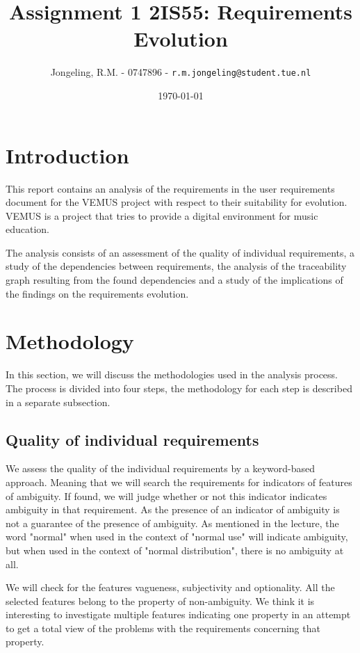\documentclass[a4paper,twoside, twocolumn,11pt]{article}
\title{\vspace{-\baselineskip}\sffamily\bfseries Assignment 1 2IS55: Requirements Evolution}
\author{Jongeling, R.M. - 0747896 - {\tt r.m.jongeling@student.tue.nl}}
\date{\today}
\numberwithin{equation}{section}
\begin{document}
\maketitle

\section{Introduction}
This report contains an analysis of the requirements in the user requirements document for the VEMUS project \cite{VEMUS} with respect to their suitability for evolution. VEMUS is a project that tries to provide a digital environment for music education. 

The analysis consists of an assessment of the quality of individual requirements, a study of the dependencies between requirements, the analysis of the traceability graph resulting from the found dependencies and a study of the implications of the findings on the requirements evolution.

\section{Methodology}
In this section, we will discuss the methodologies used in the analysis process. The process is divided into four steps, the methodology for each step is described in a separate subsection.

\subsection{Quality of individual requirements}
We assess the quality of the individual requirements by a keyword-based approach. Meaning that we will search the requirements for indicators of features of ambiguity. If found, we will judge whether or not this indicator indicates ambiguity in that requirement. As the presence of an indicator of ambiguity is not a guarantee of the presence of ambiguity. As mentioned in the lecture, the word "normal" when used in the context of "normal use" will indicate ambiguity, but when used in the context of "normal distribution", there is no ambiguity at all. 

We will check for the features vagueness, subjectivity and optionality. All the selected features belong to the property of non-ambiguity. We think it is interesting to investigate multiple features indicating one property in an attempt to get a total view of the problems with the requirements concerning that property. 
\end{document}
